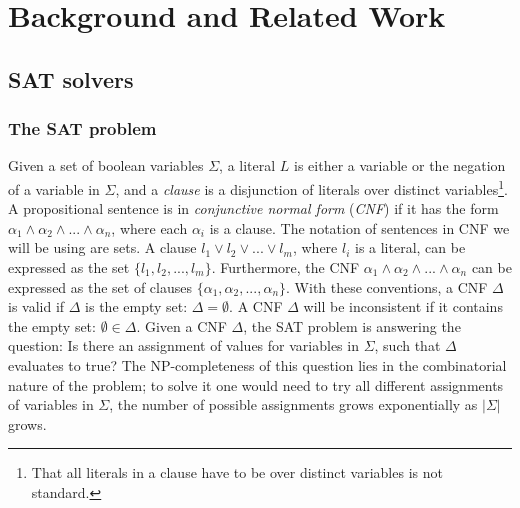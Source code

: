 \documentclass[12pt]{diicc}
\begin{document}
%
% 
\chapter{Background and Related Work}\label{chap:background}
\section{SAT solvers}

\subsection{The SAT problem}

Given a set of boolean variables $\Sigma$, a literal $L$ is either a variable or the negation of a variable in $\Sigma$, and a \textit{clause} is a disjunction of literals over distinct variables\footnote[1]{That all literals in a clause have to be over distinct variables is not standard.}. A propositional sentence is in \textit{conjunctive normal form} (\textit{CNF}) if it has the form $\alpha_{1} \wedge \alpha_{2} \wedge ... \wedge \alpha_{n}$, where each $\alpha_{i}$ is a clause. The notation of sentences in CNF we will be using are sets. A clause $l_{1} \vee l_{2} \vee ... \vee l_{m}$, where $l_{i}$ is a literal, can be expressed as the set $\{l_{1},l_{2},...,l_{m}\}$. Furthermore, the CNF $\alpha_{1} \wedge \alpha_{2} \wedge ... \wedge \alpha_{n}$ can be expressed as the set of clauses $\{\alpha_{1},\alpha_{2},...,\alpha_{n}\}$. With these conventions, a CNF $\Delta$ is valid if $\Delta$ is the empty set: $\Delta = \emptyset$. A CNF $\Delta$ will be inconsistent if it contains the empty set: $\emptyset \in \Delta$. 
Given a CNF $\Delta$, the SAT problem is answering the question: Is there an assignment of values for variables in $\Sigma$, such that $\Delta$ evaluates to true? The NP-completeness of this question lies in the combinatorial nature of the problem; to solve it one would need to try all different assignments of variables in $\Sigma$, the number of possible assignments grows exponentially as $|\Sigma|$ grows.
\end{document}
